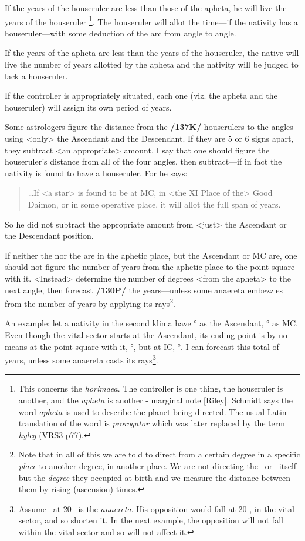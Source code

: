 If the years of the houseruler are less than those of the apheta, he will live the years of the houseruler
\footnote{This concerns the \textsl{horimaea}. The controller is one thing, the houseruler is another, and the \textsl{apheta} is
another - marginal note [Riley]. Schmidt says the word \textsl{apheta} is used to describe the planet being directed. The usual Latin translation of the word is \textsl{prorogator} which was later replaced by the term \textsl{hyleg} (VRS3 p77).}. The houseruler will allot the time—if the nativity has a houseruler—with some deduction of the arc from angle to angle. 

If the years of the apheta are less than the years of the houseruler, the native will live the number of years allotted by the apheta and the nativity will be judged to lack a houseruler. 

If the controller is appropriately situated, each one (viz. the apheta and the houseruler) will assign its own period of years.

Some astrologers figure the distance from the \textbf{/137K/} houserulers to the angles using <only> the Ascendant and the Descendant. If they are 5 or 6 signs apart, they subtract <an appropriate> amount. I say that one should figure the houseruler’s distance from all of the four angles, then subtract—if in fact the nativity is found to have a houseruler. For he says: 
\begin{quote}\ldots If <a star> is found to be at MC, in <the XI Place of the> Good Daimon, or in some operative place, it will allot the full span of years.
\end{quote}

So he did not subtract the appropriate amount from <just> the Ascendant or the Descendant position. 

If neither the \Sun\xspace nor the \Moon\xspace are in the aphetic place, but the Ascendant or MC are, one should not figure the number of years from the aphetic place to the point square with it. <Instead> determine the number of degrees <from the apheta> to the next angle, then forecast \textbf{/130P/} the years—unless some anaereta embezzles from the number of years by applying its rays\footnote{Note that in all of this we are told to direct from a certain degree in a specific \textsl{place} to another degree, in another place. We are not directing the \Sun\, or \Moon\, itself but the \textsl{degree} they occupied at birth and we measure the distance between them by rising (ascension) times.}.

An example: let a nativity in the second klima have \Gemini\xspace 8° as the Ascendant, \Aquarius\xspace 22° as MC. Even though the vital sector starts at the Ascendant, its ending point is by no means at the point square with it, \Virgo\xspace 8°, but at IC, \Leo\xspace 22°. I can forecast this total of years, unless some anaereta casts its rays\footnote{Assume \Mars\, at 20 \Capricorn\, is the \textsl{anaereta}. His opposition would fall at 20 \Cancer, in the vital sector, and so shorten it. In the next example, the opposition will not fall within the vital sector and so will not affect it.}. 

